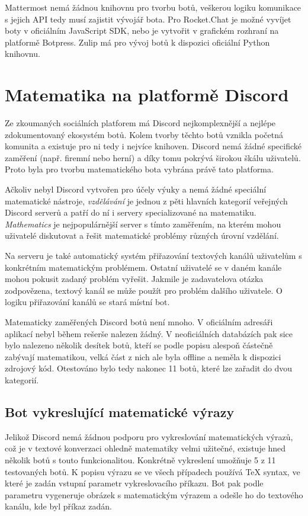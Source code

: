 \documentclass[FM]{tulthesis}
\begin{document}
	Mattermost nemá žádnou knihovnu pro tvorbu botů, veškerou logiku komunikace s jejich API tedy musí zajistit vývojář bota. Pro Rocket.Chat je možné vyvíjet boty v oficiálním JavaScript SDK, nebo je vytvořit v grafickém rozhraní na platformě Botpress. Zulip má pro vývoj botů k dispozici oficiální Python knihovnu.
		
	\chapter{Matematika na platformě Discord}
	
	Ze zkoumaných sociálních platforem má Discord nejkomplexnější a nejlépe zdokumentovaný ekosystém botů. Kolem tvorby těchto botů vznikla početná komunita a existuje pro ni tedy i nejvíce knihoven. Discord nemá žádné specifické zaměření (např. firemní nebo herní) a díky tomu pokrývá širokou škálu uživatelů. Proto byla pro tvorbu matematického bota vybrána právě tato platforma.
	
	Ačkoliv nebyl Discord vytvořen pro účely výuky a nemá žádné speciální matematické nástroje, \textit{vzdělávání} je jednou z pěti hlavních kategorií veřejných Discord serverů a patří do ní i servery specializované na matematiku. \textit{Mathematics} je nejpopulárnější server s tímto zaměřením, na kterém mohou uživatelé diskutovat a řešit matematické problémy různých úrovní vzdělání.
	
	Na serveru je také automatický systém přiřazování textových kanálů uživatelům s konkrétním matematickým problémem. Ostatní uživatelé se v daném kanále mohou pokusit zadaný problém vyřešit. Jakmile je zadavatelova otázka zodpovězena, textový kanál se může použít pro problém dalšího uživatele. O logiku přiřazování kanálů se stará místní bot.
	
	Matematicky zaměřených Discord botů není mnoho. V oficiálním adresáři aplikací nebyl během rešerše nalezen žádný. V neoficiálních databázích pak sice bylo nalezeno několik desítek botů, kteří se podle popisu alespoň částečně zabývají matematikou, velká část z nich ale byla offline a neměla k dispozici zdrojový kód. Otestováno bylo tedy nakonec 11 botů, které lze zařadit do dvou kategorií.
	
	\section{Bot vykreslující matematické výrazy}

	Jelikož Discord nemá žádnou podporu pro vykreslování matematických výrazů, což je v textové konverzaci ohledně matematiky velmi užitečné, existuje hned několik botů s touto funkcionalitou. Konkrétně vykreslení umožňuje 5 z 11 testovaných botů. K popisu výrazu se ve všech případech používá TeX syntax, ve které je zadán vstupní parametr vykreslovacího příkazu. Bot pak podle parametru vygeneruje obrázek s matematickým výrazem a odešle ho do textového kanálu, kde byl příkaz zadán.
	
\end{document}
